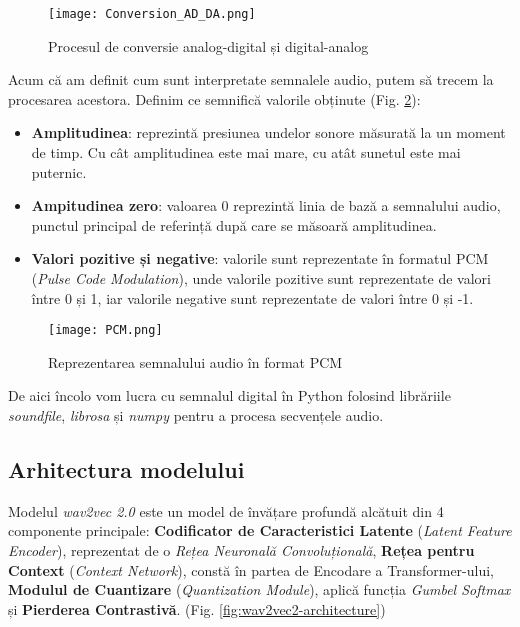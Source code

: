 \begin{figure}[h]
    \centering
    \texttt{[image: Conversion\_AD\_DA.png]}
    \caption{Procesul de conversie analog-digital și digital-analog\protect\footnotemark[1]}
    \label{fig:conversion-ad-da}
\end{figure}

\par
Acum că am definit cum sunt interpretate semnalele audio, putem să trecem la procesarea acestora.
Definim ce semnifică valorile obținute (Fig. \ref{fig:pcm}):

\begin{itemize}
    \item \textbf{Amplitudinea}: reprezintă presiunea undelor sonore măsurată la un moment de timp.
    Cu cât amplitudinea este mai mare, cu atât sunetul este mai puternic.
    \item \textbf{Ampitudinea zero}: valoarea 0 reprezintă linia de bază a semnalului audio, punctul
    principal de referință după care se măsoară amplitudinea.
    \item \textbf{Valori pozitive și negative}: valorile sunt reprezentate în formatul PCM (\textit{Pulse Code Modulation}),
    unde valorile pozitive sunt reprezentate de valori între 0 și 1, iar valorile negative sunt reprezentate
    de valori între 0 și -1.
\end{itemize}

\begin{figure}[h]
    \centering
    \texttt{[image: PCM.png]}
    \caption{Reprezentarea semnalului audio în format PCM\protect\footnotemark[1]}
    \label{fig:pcm}
\end{figure}

\par
De aici încolo vom lucra cu semnalul digital în Python folosind librăriile \textit{soundfile},
\textit{librosa} și \textit{numpy} pentru a procesa secvențele audio.
\vspace{-1em}
\subsection{Arhitectura modelului}
Modelul \textit{wav2vec 2.0} este un model de învățare profundă alcătuit din 4
componente principale: \textbf{Codificator de Caracteristici Latente} 
(\textit{Latent Feature Encoder}), reprezentat de o \textit{Rețea Neuronală Convoluțională},
\textbf{Rețea pentru Context} (\textit{Context Network}), constă în partea de Encodare
a Transformer-ului, \textbf{Modulul de Cuantizare} (\textit{Quantization Module}),
aplică funcția \textit{Gumbel Softmax} și \textbf{Pierderea Contrastivă}. (Fig. \ref{fig:wav2vec2-architecture})

